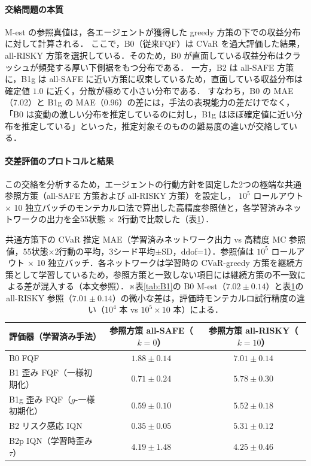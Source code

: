 \documentclass[a4paper,10pt]{jsarticle}
\theoremstyle{definition}
\begin{document}
\paragraph{交絡問題の本質}
M-est の参照真値は，各エージェントが獲得した greedy 方策の下での収益分布に対して計算される．
ここで，B0（従来FQF）は CVaR を過大評価した結果，all-RISKY 方策を選択している．そのため，B0 が直面している収益分布はクラッシュが頻発する厚い下側裾をもつ分布である．
一方，B2 は all-SAFE 方策に，B1g は all-SAFE に近い方策に収束しているため，直面している収益分布は確定値 $1.0$ に近く，分散が極めて小さい分布である．
すなわち，B0 の MAE（7.02）と B1g の MAE（0.96）の差には，手法の表現能力の差だけでなく，「B0 は変動の激しい分布を推定しているのに対し，B1g はほぼ確定値に近い分布を推定している」といった，推定対象そのものの難易度の違いが交絡している．

\paragraph{交差評価のプロトコルと結果}
この交絡を分析するため，エージェントの行動方針を固定した2つの極端な共通参照方策（all-SAFE 方策および all-RISKY 方策）を設定し，
$10^5$ ロールアウト $\times$ 10 独立バッチのモンテカルロ法で算出した高精度参照値と，各学習済みネットワークの出力を全55状態 $\times$ 2行動で比較した（表\ref{tab:B2}）．

\begin{table}[htbp]
\centering
\caption{共通方策下の CVaR 推定 MAE（学習済みネットワーク出力 vs 高精度 MC 参照値，55状態$\times$2行動の平均，3シード平均$\pm$SD，ddof=1）．参照値は $10^5$ ロールアウト $\times$ 10 独立バッチ．各ネットワークは学習時の CVaR-greedy 方策を継続方策として学習しているため，参照方策と一致しない項目には継続方策の不一致による差が混入する（本文参照）．※表\ref{tab:B1}の B0 M-est（$7.02\pm0.14$）と表\ref{tab:B2}の all-RISKY 参照（$7.01\pm0.14$）の微小な差は，評価時モンテカルロ試行精度の違い（$10^4$ 本 vs $10^5\times10$ 本）による．}
\label{tab:B2}
\small
\setlength{\tabcolsep}{4pt}
\begin{tabular}{lcc}
\toprule
評価器（学習済み手法） & 参照方策 all-SAFE（$k=0$） & 参照方策 all-RISKY（$k=10$）\\
\midrule
B0 FQF & $1.88\pm0.14$ & $7.01\pm0.14$\\
B1 歪み FQF（一様初期化） & $0.71\pm0.24$ & $5.78\pm0.30$\\
B1g 歪み FQF（$g$-一様初期化） & $0.59\pm0.10$ & $5.52\pm0.18$\\
B2 リスク感応 IQN & $\mathbf{0.35\pm0.05}$ & $5.31\pm0.12$\\
B2p IQN（学習時歪み $\tau$） & $4.19\pm1.48$ & $4.25\pm0.46$\\
\bottomrule
\end{tabular}
\end{table}
\end{document}
